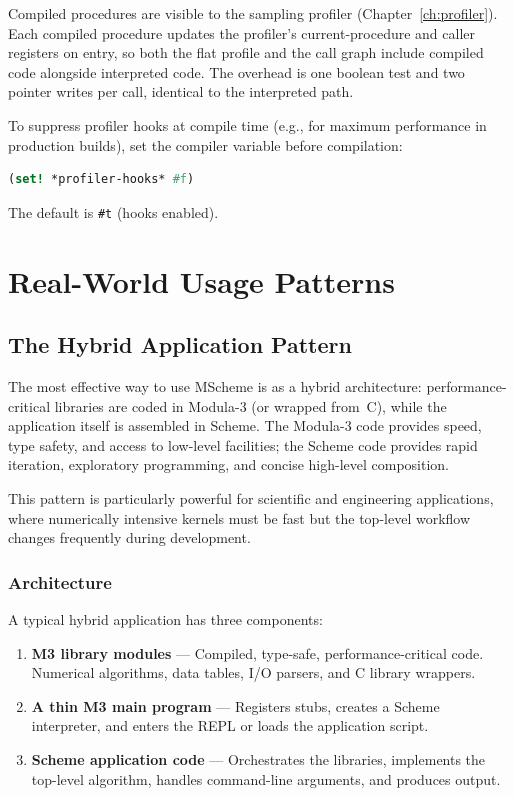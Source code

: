 \documentclass[12pt]{report}
\begin{document}
Compiled procedures are visible to the sampling profiler
(Chapter~\ref{ch:profiler}).  Each compiled procedure updates the
profiler's current-procedure and caller registers on entry, so both
the flat profile and the call graph include compiled code alongside
interpreted code.  The overhead is one boolean test and two pointer
writes per call, identical to the interpreted path.

To suppress profiler hooks at compile time (e.g., for maximum
performance in production builds), set the compiler variable before
compilation:

\begin{lstlisting}[language=Scheme]
(set! *profiler-hooks* #f)
\end{lstlisting}

The default is {\tt \#t} (hooks enabled).


\chapter{Real-World Usage Patterns}

\section{The Hybrid Application Pattern}\label{sec:hybrid}

The most effective way to use MScheme is as a hybrid architecture:
performance-critical libraries are coded in Modula-3 (or wrapped
from~C), while the application itself is assembled in Scheme.  The
Modula-3 code provides speed, type safety, and access to low-level
facilities; the Scheme code provides rapid iteration, exploratory
programming, and concise high-level composition.

This pattern is particularly powerful for scientific and engineering
applications, where numerically intensive kernels must be fast but
the top-level workflow changes frequently during development.

\subsection{Architecture}

A typical hybrid application has three components:

\begin{enumerate}
\item \textbf{M3 library modules} --- Compiled, type-safe,
  performance-critical code.  Numerical algorithms, data tables,
  I/O parsers, and C library wrappers.
\item \textbf{A thin M3 main program} --- Registers stubs, creates
  a Scheme interpreter, and enters the REPL or loads the application
  script.
\item \textbf{Scheme application code} --- Orchestrates the
  libraries, implements the top-level algorithm, handles
  command-line arguments, and produces output.
\end{enumerate}
\end{document}
